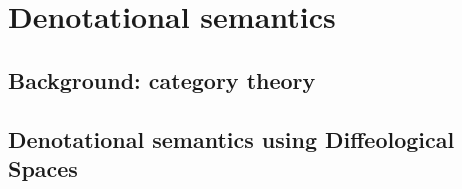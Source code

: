 \section{Denotational semantics} %
\label{sec:denotational_semantics}

\subsection{Background: category theory} %
\label{sub:background_category_theory}

\subsection{Denotational semantics using Diffeological Spaces} %
\label{sub:denotational_semantics_using_diffeological_spaces}

